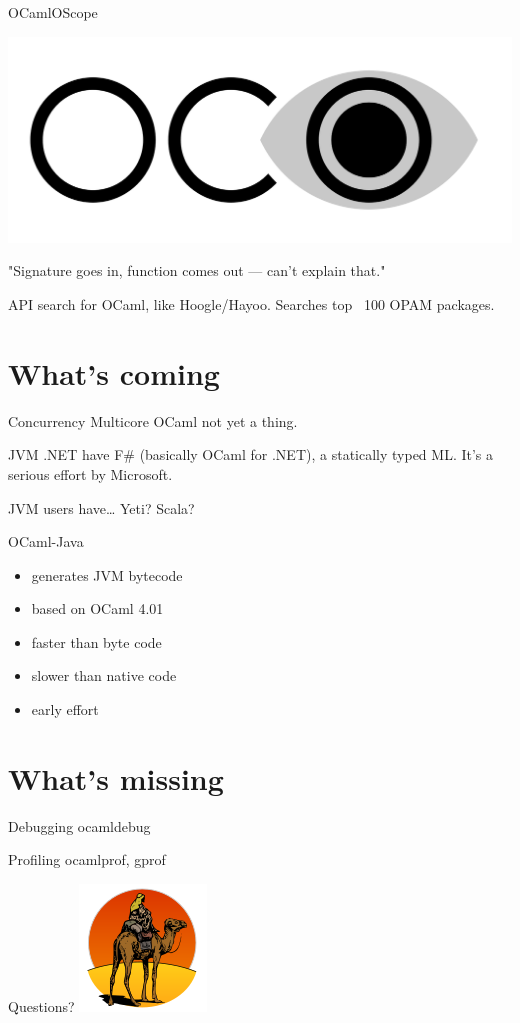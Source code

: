 \documentclass{beamer}
\begin{document}
\begin{frame}{OCamlOScope}
  \begin{centering}
    \includegraphics[width=\textwidth]{ocamloscope}
  \end{centering}
  "Signature goes in, function comes out — can't explain that."

  API search for OCaml, like Hoogle/Hayoo. Searches top ~100 OPAM packages.
\end{frame}

\section{What's coming}

\begin{frame}{Concurrency}
  Multicore OCaml not yet a thing.
\end{frame}

\begin{frame}{JVM}
  .NET have F\# (basically OCaml for .NET), a statically typed ML. It's a serious
  effort by Microsoft. \pause

  JVM users have… Yeti? Scala?

  \begin{block}{OCaml-Java}
    \begin{itemize}
      \item generates JVM bytecode
      \item based on OCaml 4.01
      \item faster than byte code
      \item slower than native code
      \item early effort
    \end{itemize}
  \end{block}

\end{frame}

\section{What's missing}

\begin{frame}{Debugging}
  ocamldebug
\end{frame}

\begin{frame}{Profiling}
  ocamlprof, gprof
\end{frame}

\begin{frame}{Questions?}
  \centering
  \includegraphics[height=.85\textheight]{camel}
\end{frame}
\end{document}
